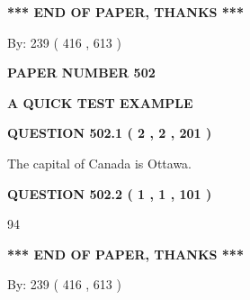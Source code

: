 \documentclass[12pt]{article}
\begin{document}
\vspace{1.0in} 
{\textbf{\large{ *** END OF PAPER, THANKS *** }}} 
   
   
\hspace{1.0in} By: 
 239 ( 416 ,  613 )
   
   
   
   
\newpage 
\setcounter{page}{ 
   502001 } 
   
   
   
   
 {\textbf{ \Large{ PAPER NUMBER  502  }}}
   
   
\vspace{0.2in}
   
   
   
   
   
   
 \vspace{0.2in}
{\LARGE {\textbf{ A QUICK TEST EXAMPLE}}}
   
   
  
\vspace{0.2in}
  
{\textbf{\Large{QUESTION
502.1 
 ( 2 , 2 , 201 )
}}}
  
  
 
 
\noindent{}
 
 
The capital of Canada is Ottawa.
 
 
 
 
  
\vspace{0.2in}
  
{\textbf{\Large{QUESTION
502.2 
 ( 1 , 1 , 101 )
}}}
  
  
 
 
\noindent{}

94
 
 
   
   
 \vspace{0.2in}
 
   
   
   
   
\vspace{1.0in} 
{\textbf{\large{ *** END OF PAPER, THANKS *** }}} 
   
   
\hspace{1.0in} By: 
 239 ( 416 ,  613 )
   
\end{document}

